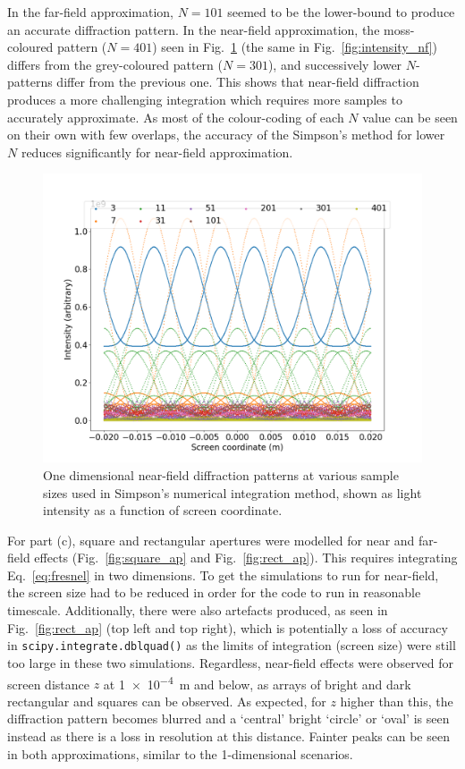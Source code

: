 \documentclass[hyphens,twocolumn,nobalancelastpage,aps,10pt,citeautoscript,longbibliography]{revtex4-2}
\begin{document}
In the far-field approximation, $N = 101$ seemed to be the lower-bound to
produce an accurate diffraction pattern. In the near-field approximation, the
moss-coloured pattern ($N=401$) seen in Fig.~\ref{fig:points_nf} (the same in
Fig.~\ref{fig:intensity_nf}) differs from the grey-coloured pattern ($N=301$),
and successively lower $N$-patterns differ from the previous one. This shows
that near-field diffraction produces a more challenging integration which
requires more samples to accurately approximate. As most of the colour-coding
of each $N$ value can be seen on their own with few overlaps, the accuracy of
the Simpson's method for lower $N$ reduces significantly for near-field
approximation.

\begin{figure}[htpb] \centering
	\includegraphics[width=1\linewidth]{./assets/diffraction_1d/points_nf.png}
	\caption{One dimensional near-field diffraction patterns at various sample sizes used in Simpson's numerical integration method, shown as light intensity as a function of screen coordinate.}%
	\label{fig:points_nf}
\end{figure}

For part (c), square and rectangular apertures were modelled for near and
far-field effects (Fig.~\ref{fig:square_ap} and Fig.~\ref{fig:rect_ap}). This
requires integrating Eq.~\ref{eq:fresnel} in two dimensions. To get the
simulations to run for near-field, the screen size had to be reduced in order
for the code to run in reasonable timescale. Additionally, there were also
artefacts produced, as seen in Fig.~\ref{fig:rect_ap} (top left and top right),
which is potentially a loss of accuracy in
\lstinline{scipy.integrate.dblquad()} as the limits of integration (screen
size) were still too large in these two simulations. Regardless, near-field
effects were observed for screen distance $z$ at \qty{1e-4}{\metre} and below,
as arrays of bright and dark rectangular and squares can be observed. As
expected, for $z$ higher than this, the diffraction pattern becomes blurred and
a `central' bright `circle' or `oval' is seen instead as there is a loss in
resolution at this distance. Fainter peaks can be seen in both approximations,
similar to the 1-dimensional scenarios.
\end{document}
